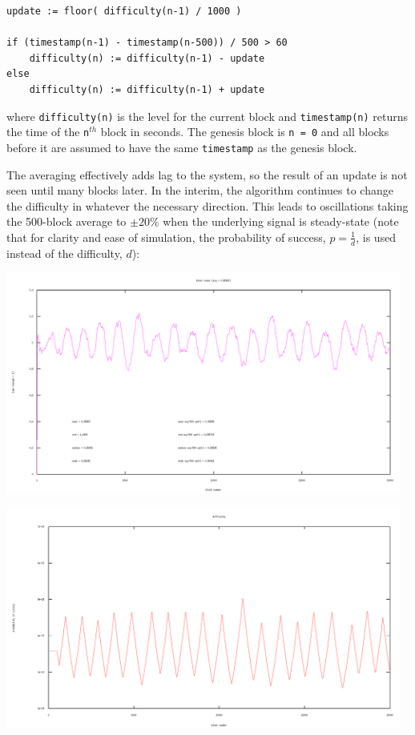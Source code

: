 \documentclass[10pt,a4paper]{article}
\begin{document}
\begin{verbatim}
update := floor( difficulty(n-1) / 1000 )

if (timestamp(n-1) - timestamp(n-500)) / 500 > 60
    difficulty(n) := difficulty(n-1) - update
else
    difficulty(n) := difficulty(n-1) + update
\end{verbatim}
where {\tt difficulty(n)} is the level for the current block and {\tt timestamp(n)} returns the time of the {\tt n}$^{th}$ block in seconds. The genesis block is {\tt n = 0} and all blocks before it are assumed to have the same {\tt timestamp} as the genesis block.

The averaging effectively adds lag to the system, so the result of an update is not seen until many blocks later. In the interim, the algorithm continues to change the difficulty in whatever the necessary direction. This leads to oscillations taking the 500-block average to $\pm 20\%$ when the underlying signal is steady-state (note that for clarity and ease of simulation, the probability of success, $p = \frac{1}{d}$, is used instead of the difficulty, $d$):

\includegraphics[width=13cm]{SimulationGraphs/simulation_avg-500_upd-1_.png}

\includegraphics[width=13cm]{SimulationGraphs/simulation_avg-500_upd-1_diff.png}
\end{document}
